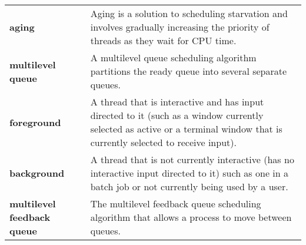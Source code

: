 \begin{tabular}{>{\raggedright}p{} >{\raggedright\arraybackslash}p{}}
\textbf{aging} & Aging is a solution to scheduling starvation and involves gradually increasing the priority of threads as they wait for CPU time. \\
\textbf{multilevel queue} & A multilevel queue scheduling algorithm partitions the ready queue into several separate queues. \\
\textbf{foreground} & A thread that is interactive and has input directed to it (such as a window currently selected as active or a terminal window that is currently selected to receive input). \\
\textbf{background} & A thread that is not currently interactive (has no interactive input directed to it) such as one in a batch job or not currently being used by a user. \\
\textbf{multilevel feedback queue} & The multilevel feedback queue scheduling algorithm that allows a process to move between queues. \\
\bottomrule
\end{tabular}
\vspace{\baselineskip}

